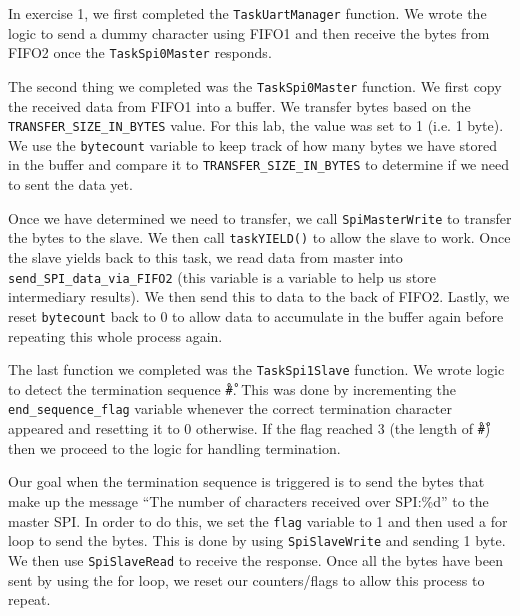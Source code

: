 \documentclass[11pt, letterpaper, titlepage]{article}
\begin{document}
In exercise 1, we first completed the \texttt{TaskUartManager} function. We wrote the logic to send a dummy character using FIFO1 and then receive the bytes from FIFO2 once the \texttt{TaskSpi0Master} responds.  

The second thing we completed was the \texttt{TaskSpi0Master} function. We first copy the received data from FIFO1 into a buffer. We transfer bytes based on the \texttt{TRANSFER_SIZE_IN_BYTES} value. For this lab, the value was set to 1 (i.e. 1 byte). We use the \texttt{bytecount} variable to keep track of how many bytes we have stored in the buffer and compare it to \texttt{TRANSFER_SIZE_IN_BYTES} to determine if we need to sent the data yet.

Once we have determined we need to transfer, we call \texttt{SpiMasterWrite} to transfer the bytes to the slave. We then call \texttt{taskYIELD()} to allow the slave to work. Once the slave yields back to this task, we read data from master into \texttt{send_SPI_data_via_FIFO2} (this variable is a variable to help us store intermediary results). We then send this to data to the back of FIFO2. Lastly, we reset \texttt{bytecount} back to 0 to allow data to accumulate in the buffer again before repeating this whole process again.

The last function we completed was the \texttt{TaskSpi1Slave} function. We wrote logic to detect the termination sequence \texttt{\r#\r}. This was done by incrementing the \texttt{end_sequence_flag} variable whenever the correct termination character appeared and resetting it to 0 otherwise. If the flag reached 3 (the length of \texttt{\r#\r}) then we proceed to the logic for handling termination.

Our goal when the termination sequence is triggered is to send the bytes that make up the message ``The number of characters received over SPI:\%d'' to the master SPI. In order to do this, we set the \texttt{flag} variable to 1 and then used a for loop to send the bytes. This is done by using \texttt{SpiSlaveWrite} and sending 1 byte. We then use \texttt{SpiSlaveRead} to receive the response. Once all the bytes have been sent by using the for loop, we reset our counters/flags to allow this process to repeat.
\end{document}
